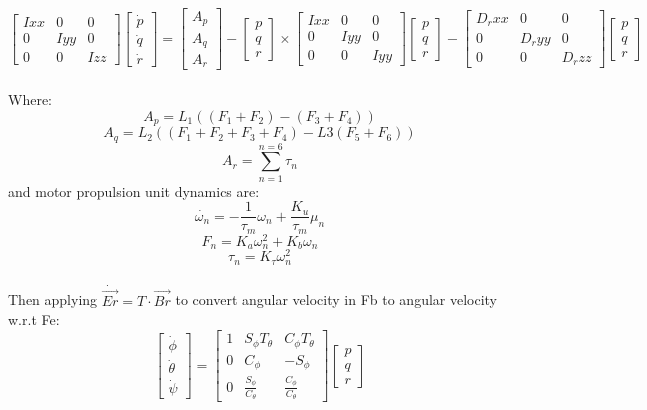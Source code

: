 \documentclass[12pt,a4paper,twoside]{report}
\begin{document}
			$$ 
			\begin{bmatrix}
			Ixx & 0 & 0 \\
			0 & Iyy & 0 \\
			0 & 0 & Izz
			\end{bmatrix}
			\begin{bmatrix}
			\dot{p} \\
			\dot{q} \\
			\dot{r}
			\end{bmatrix}
			=
			\begin{bmatrix}
			A_p \\
			A_q \\
			A_r
			\end{bmatrix}
			-
			\begin{bmatrix}
			p \\
			q \\
			r 
			\end{bmatrix}
			\times
			\begin{bmatrix}
			Ixx & 0 & 0 \\
			0 & Iyy & 0 \\
			0 & 0 & Iyy
			\end{bmatrix}
			\begin{bmatrix}
			p \\
			q \\
			r 
			\end{bmatrix}
			-
			\begin{bmatrix}
			D_rxx & 0 & 0 \\
			0 & D_ryy & 0 \\
			0 & 0 & D_rzz
			\end{bmatrix}
			\begin{bmatrix}
			p \\
			q \\
			r
			\end{bmatrix}
			$$ 
			\\
			Where:
			\[ A_p = L_1 ((F_1+F_2) - (F_3+F_4)) \]
			\[ A_q = L_2 ((F_1+F_2+F_3+F_4) - L3 (F_5+F_6)) \]
			\[ A_r = \sum_{n = 1}^{n = 6}\tau_n \]
			and motor propulsion unit dynamics are:
			\[\dot{\omega_n} = -\frac{1}{\tau_m}\omega_n	 + \frac{K_u}{\tau_m}\mu_n\]
			\[ F_n = K_a \omega_n^2 + K_b\omega_n \]
			\[\tau_n = K_\tau \omega_n^2 \]
			\\
			Then applying \(\dot{\vec{Er}} = T \cdot \vec{Br} \) to convert angular velocity in Fb to angular velocity w.r.t Fe:
			\\
			$$
			\begin{bmatrix}
			\dot{\phi} \\
			\dot{\theta} \\
			\dot{\psi}
			\end{bmatrix}
			=
			\begin{bmatrix}
			1 & S_\phi T_\theta & C_\phi T_\theta \\
			0 & C_\phi & -S_\phi\\
			0 & \frac{S_\phi}{C_\theta}  & \frac{C_\phi}{C_\theta}
			\end{bmatrix}
			\begin{bmatrix}
			p \\
			q \\
			r 
			\end{bmatrix}
			$$ 
		
\end{document}
